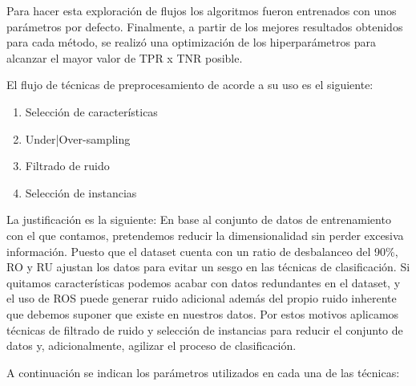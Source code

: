 Para hacer esta exploración de flujos los algoritmos fueron entrenados con unos parámetros por defecto. Finalmente, a partir de los mejores resultados obtenidos para cada método, se realizó una optimización de los hiperparámetros para alcanzar el mayor valor de TPR x TNR posible.

\vspace{\baselineskip}

El flujo de técnicas de preprocesamiento de acorde a su uso es el siguiente:
\begin{enumerate}
    \item Selección de características
    \item Under|Over-sampling
    \item Filtrado de ruido
    \item Selección de instancias
\end{enumerate}

\vspace{\baselineskip}

La justificación es la siguiente: En base al conjunto de datos de entrenamiento con el que contamos, pretendemos reducir la dimensionalidad sin perder excesiva información. Puesto que el dataset cuenta con un ratio de desbalanceo del 90\%, RO y RU ajustan los datos para evitar un sesgo en las técnicas de clasificación. Si quitamos características podemos acabar con datos redundantes en el dataset, y el uso de ROS puede generar ruido adicional además del propio ruido inherente que debemos suponer que existe en nuestros datos. Por estos motivos aplicamos técnicas de filtrado de ruido y selección de instancias para reducir el conjunto de datos y, adicionalmente, agilizar el proceso de clasificación. 

\vspace{\baselineskip}

A continuación se indican los parámetros utilizados en cada una de las técnicas:

